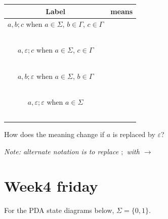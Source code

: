 \documentclass[12pt, oneside]{article}
\begin{document}
\begin{center}
\begin{tabular}{|c|c|}
\hline
Label & means \\
\hline
$a, b ; c$ when $a \in \Sigma$, $b\in \Gamma$, $c \in \Gamma$ 
& \hspace{3in} \\
& \\
& \\
& \\
& \\
&\\
\hline
$a, \varepsilon ; c$ when $a \in \Sigma$, $c \in \Gamma$ 
& \hspace{3in} \\
& \\
& \\
& \\
& \\
&\\
\hline
$a, b ; \varepsilon$ when $a \in \Sigma$, $b\in \Gamma$
& \hspace{3in} \\
& \\
& \\
& \\
& \\
&\\
\hline
$a, \varepsilon ; \varepsilon$ when $a \in \Sigma$
& \hspace{3in} \\
& \\
& \\
& \\
& \\
&\\
\hline
\end{tabular}
\end{center}


How does the meaning change if $a$ is replaced by $\varepsilon$?

{\it Note: alternate notation is to replace $;$ with $\to$}
 \vfill
\section*{Week4 friday}


    
For the PDA state diagrams below, $\Sigma = \{0,1\}$.
\end{document}
